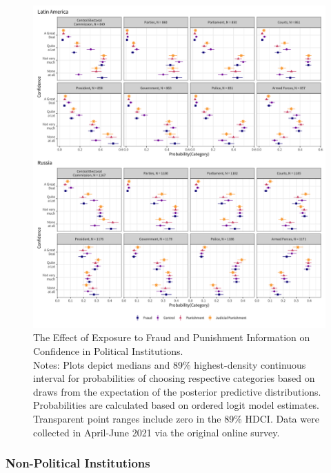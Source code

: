 \documentclass[11pt, ngerman,english,a4]{article}
\begin{document}
\begin{figure}[H]
	\centering
	\includegraphics[width=\linewidth,trim=4 4 4 4,clip]{figs/probs_hdi89_1.png}
	\caption{The Effect of Exposure to Fraud and Punishment Information on Confidence in Political Institutions.  \\
		\footnotesize{Notes: Plots depict medians and 89\% highest-density continuous interval for probabilities of choosing respective categories based on draws from the expectation of the posterior predictive distributions. Probabilities are calculated based on ordered logit model estimates.
			Transparent point ranges include zero in the 89\% HDCI.
	Data were collected in April-June 2021 via the original online survey. } }
	\singlespacing
	\raggedright
	\label{fig:main-2}
\end{figure}
    
    
    
% 
% 

\clearpage

\subsubsection*{Non-Political Institutions}
\end{document}

